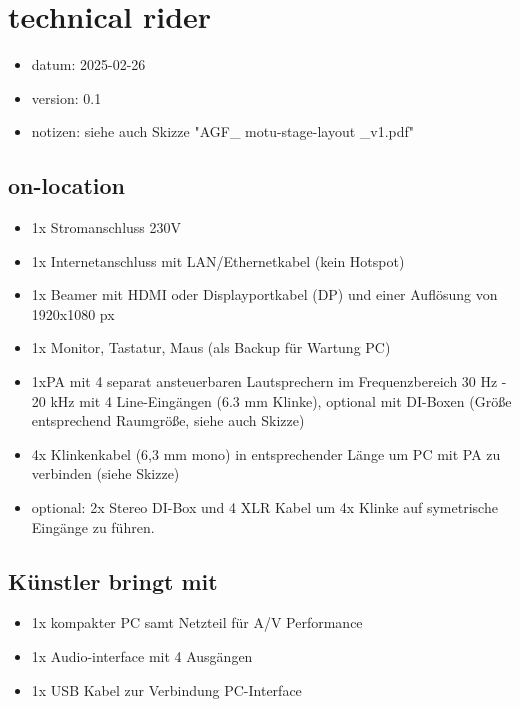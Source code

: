 \documentclass[11pt]{article}
\author{chrs}
\date{\today}
\title{}
\begin{document}
\section{technical rider}
\label{sec:orga61f55d}
\begin{itemize}
\item datum: 2025-02-26
\item version: 0.1
\item notizen: siehe auch Skizze "AGF\_ motu-stage-layout \_v1.pdf"
\end{itemize}

\subsection{on-location}
\label{sec:org4c661cb}
\begin{itemize}
\item 1x Stromanschluss 230V
\item 1x Internetanschluss mit LAN/Ethernetkabel (kein Hotspot)
\item 1x Beamer mit HDMI oder Displayportkabel (DP) und einer Auflösung von 1920x1080 px
\item 1x Monitor, Tastatur, Maus (als Backup für Wartung PC)
\item 1xPA mit 4 separat ansteuerbaren Lautsprechern im Frequenzbereich 30 Hz - 20 kHz mit 4 Line-Eingängen (6.3 mm Klinke), optional mit DI-Boxen (Größe entsprechend Raumgröße, siehe auch Skizze)
\item 4x Klinkenkabel (6,3 mm mono) in entsprechender Länge um PC mit PA zu verbinden (siehe Skizze)
\item optional: 2x Stereo DI-Box und 4 XLR Kabel um 4x Klinke auf symetrische Eingänge zu führen.
\end{itemize}
\subsection{Künstler bringt mit}
\label{sec:org58edb33}
\begin{itemize}
\item 1x kompakter PC samt Netzteil für A/V Performance
\item 1x Audio-interface mit 4 Ausgängen
\item 1x USB Kabel zur Verbindung PC-Interface
\end{itemize}
\end{document}
